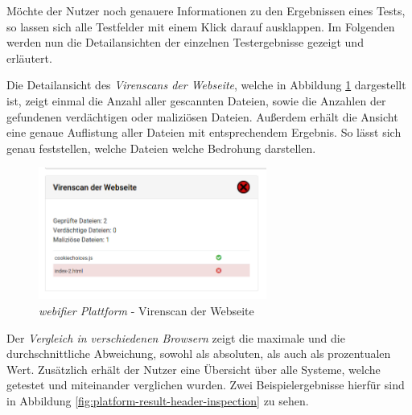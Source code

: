 Möchte der Nutzer noch genauere Informationen zu den Ergebnissen eines Tests, so lassen sich alle Testfelder mit einem Klick darauf ausklappen. Im Folgenden werden nun die Detailansichten der einzelnen Testergebnisse gezeigt und erläutert.

Die Detailansicht des \textit{Virenscans der Webseite}, welche in Abbildung
\ref{fig:platform-result-virusscan} dargestellt ist, zeigt einmal die Anzahl aller gescannten
Dateien, sowie die Anzahlen der gefundenen verdächtigen oder maliziösen Dateien. Außerdem erhält
die Ansicht eine genaue Auflistung aller Dateien mit entsprechendem Ergebnis. So lässt sich genau
feststellen, welche Dateien welche Bedrohung darstellen.

\begin{figure}[H]
  \centering
  \includegraphics[width=7.5cm]{images/platform/virusscan-malicious}
  \caption{\textit{webifier Plattform} - Virenscan der Webseite}
  \label{fig:platform-result-virusscan}
\end{figure}

Der \textit{Vergleich in verschiedenen Browsern} zeigt die maximale und die durchschnittliche
Abweichung, sowohl als absoluten, als auch als prozentualen Wert. Zusätzlich erhält der Nutzer eine
Übersicht über alle Systeme, welche getestet und miteinander verglichen wurden. Zwei
Beispielergebnisse hierfür sind in Abbildung \ref{fig:platform-result-header-inspection} zu sehen.

